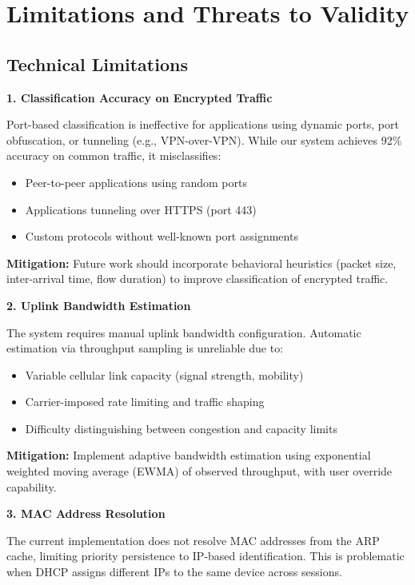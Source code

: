 \section{Limitations and Threats to Validity}
\label{sec:limitations}

\subsection{Technical Limitations}

\textbf{1. Classification Accuracy on Encrypted Traffic}

Port-based classification is ineffective for applications using dynamic ports, port obfuscation, or tunneling (e.g., VPN-over-VPN). While our system achieves 92\% accuracy on common traffic, it misclassifies:
\begin{itemize}
    \item Peer-to-peer applications using random ports
    \item Applications tunneling over HTTPS (port 443)
    \item Custom protocols without well-known port assignments
\end{itemize}

\textbf{Mitigation:} Future work should incorporate behavioral heuristics (packet size, inter-arrival time, flow duration) to improve classification of encrypted traffic.

\textbf{2. Uplink Bandwidth Estimation}

The system requires manual uplink bandwidth configuration. Automatic estimation via throughput sampling is unreliable due to:
\begin{itemize}
    \item Variable cellular link capacity (signal strength, mobility)
    \item Carrier-imposed rate limiting and traffic shaping
    \item Difficulty distinguishing between congestion and capacity limits
\end{itemize}

\textbf{Mitigation:} Implement adaptive bandwidth estimation using exponential weighted moving average (EWMA) of observed throughput, with user override capability.

\textbf{3. MAC Address Resolution}

The current implementation does not resolve MAC addresses from the ARP cache, limiting priority persistence to IP-based identification. This is problematic when DHCP assigns different IPs to the same device across sessions.

